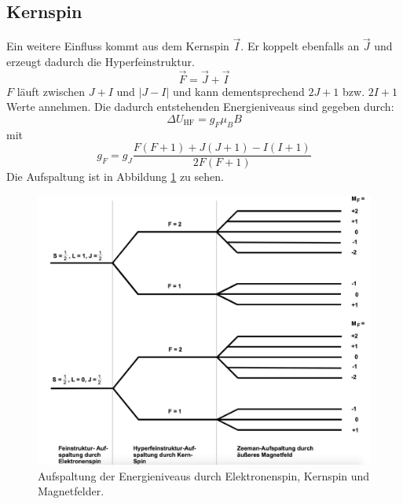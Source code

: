 \subsection{Kernspin}
Ein weitere Einfluss kommt aus dem Kernspin $\vec{I}$. Er koppelt ebenfalls an $\vec{J}$ und erzeugt dadurch die Hyperfeinstruktur.
\begin{equation}
	\vec{F}=\vec{J} +\vec{I}
\end{equation}
$F$ läuft zwischen $J+I$ und $|J-I|$ und kann dementsprechend $2J+1$ bzw. $2I+1$ Werte annehmen. Die dadurch entstehenden Energieniveaus sind gegeben durch:
\begin{equation}
	\Delta U_\mathrm{HF}=g_F\mu_BB
	\label{eqn:zeemann}
\end{equation}
mit
\begin{equation}
	g_F=g_J\frac{F(F+1)+J(J+1)-I(I+1)}{2F(F+1)}
	\label{eqn:g_F}
\end{equation}
Die Aufspaltung ist in Abbildung \ref{fig:zeemann} zu sehen.
\begin{figure}
	\centering
	\includegraphics[width=0.8\linewidth]{img/zeemann.jpg}
	\caption{Aufspaltung der Energieniveaus durch Elektronenspin, Kernspin und Magnetfelder.}
	\label{fig:zeemann}
\end{figure}
